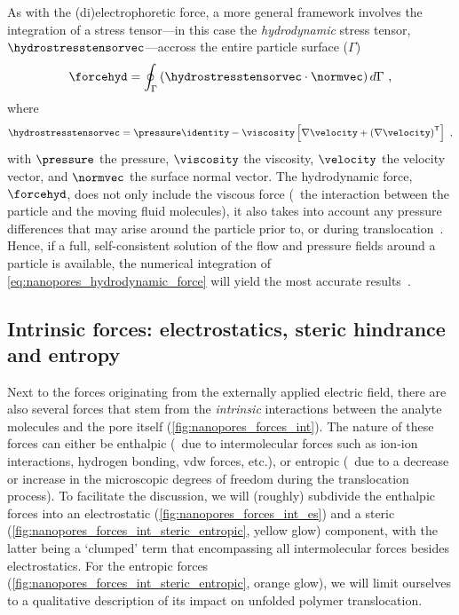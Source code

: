 As with the (di)electrophoretic force, a more general framework involves the integration of a stress
tensor---in this case the \emph{hydrodynamic} stress tensor, $\hydrostresstensorvec$---accross the entire
particle surface ($\Gamma$)~\cite{Ghosal-2019}
%
\begin{equation}\label{eq:nanopores_hydrodynamic_force}
  \forcehyd = \oint_{\Gamma} \left( \hydrostresstensorvec \cdot \normvec \right) d\Gamma
  \text{ ,}
\end{equation}
%
where
%
\begin{align}\label{eq:nanopores_hydrodynamic_stresstensor}
  \hydrostresstensorvec =
  \pressure\identity - \viscosity\left[\nabla\velocity + \left(\nabla\velocity \right)^\mathsf{T}\right]
  \text{ ,}
\end{align}
%
with $\pressure$ the pressure, $\viscosity$ the viscosity, $\velocity$ the velocity vector, and $\normvec$ the
surface normal vector. The hydrodynamic force, $\forcehyd$, does not only include the viscous force (\ie~the
interaction between the particle and the moving fluid molecules), it also takes into account any pressure
differences that may arise around the particle prior to, or during
translocation~\cite{Hoogerheide-2014,Wilson-2018}. Hence, if a full, self-consistent solution of the flow and
pressure fields around a particle is available, the numerical integration of
\cref{eq:nanopores_hydrodynamic_force} will yield the most accurate results~\cite{Galla-2014}.



\subsection{Intrinsic forces: electrostatics, steric hindrance and entropy}
%

Next to the forces originating from the externally applied electric field, there are also several forces that
stem from the \emph{intrinsic} interactions between the analyte molecules and the pore itself
(\cref{fig:nanopores_forces_int}). The nature of these forces can either be enthalpic (\ie~due to
intermolecular forces such as ion-ion interactions, hydrogen bonding, \gls{vdw} forces, etc.), or entropic
(\ie~due to a decrease or increase in the microscopic degrees of freedom during the translocation process). To
facilitate the discussion, we will (roughly) subdivide the enthalpic forces into an electrostatic
(\cref{fig:nanopores_forces_int_es}) and a steric (\cref{fig:nanopores_forces_int_steric_entropic}, yellow
glow) component, with the latter being a `clumped' term that encompassing all intermolecular forces besides
electrostatics. For the entropic forces (\cref{fig:nanopores_forces_int_steric_entropic}, orange glow), we
will limit ourselves to a qualitative description of its impact on unfolded polymer translocation.


